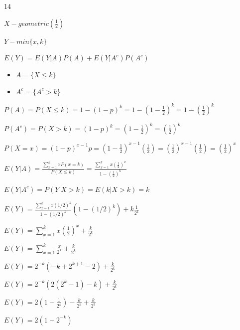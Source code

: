 \documentclass[12 pt]{article}
\begin{document}
    \begin{exercise}{14}
    \hfill

    $X - geometric(\frac{1}{2})$

    $Y - min\{x, k\}$

    \hfill

    $E(Y) = E(Y|A) P(A) + E(Y|A^c) P(A^c)$

    \begin{itemize}
        \item $A = \{ X \leq k \}$
        \item $A^c = \{ A^c > k \}$
    \end{itemize}

    $P(A) = P(X \leq k) = 1 - (1-p)^k = 1 - (1 - \frac{1}{2})^k = 1 - (\frac{1}{2})^k$

    \hfill

    $P(A^c) = P(X > k) = (1-p)^k = (1 - \frac{1}{2})^k = (\frac{1}{2})^k$

    \hfill

    $P(X=x) = (1-p)^{x-1}p = (1- \frac{1}{2})^{x-1}(\frac{1}{2}) = (\frac{1}{2})^{x-1} (\frac{1}{2}) = (\frac{1}{2})^x$

    \hfill

    $E(Y|A) = \frac{\sum_{x=1}^k x P(x=k)}{P(X \leq k)} = \frac{\sum_{x=1}^k x(\frac{1}{2})^x}{1- (\frac{1}{2})^k}$

    \hfill

    $E(Y|A^c) = P(Y|X >k) = E(k|X>k) = k$

    $E(Y) = \frac{\sum_{x=1}^k x(1/2)^k}{1 - (1/2)^k}(1 - (1/2)^k)+ k \frac{1}{2^k}$

    $E(Y) = \sum_{x=1}^k x(\frac{1}{2})^x + \frac{k}{2^k}$

    $E(Y) = \sum_{x=1}^k \frac{x}{2^x} + \frac{k}{2^k}$

    $E(Y) = 2^{-k}(-k + 2^{k+1} - 2) + \frac{k}{2^k}$

    $E(Y) = 2^{-k}(2(2^k-1)-k) + \frac{k}{2^k}$

    $E(Y) = 2(1-\frac{1}{2^k}) - \frac{k}{2^k} + \frac{k}{2^k}$

    $E(Y) = 2(1-2^{-k})$

    \hfill
    \end{exercise}
\end{document}
